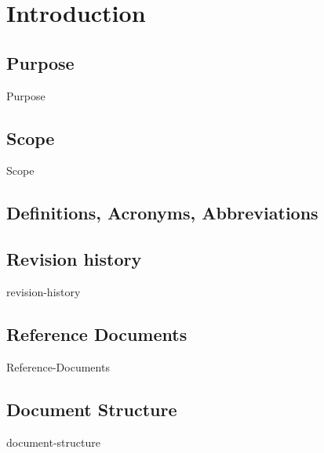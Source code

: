 \section{Introduction}

\subsection{Purpose}
{Purpose}

\subsection{Scope}
{Scope}

\subsection{Definitions, Acronyms, Abbreviations}
\printnoidxglossary[title=Definitions]
\printglossary
\glsaddallunused

\printnoidxglossary[title=Acronyms, type=acronym]
\printacronyms
\glsaddallunused[\acronymtype]


\subsection{Revision history}
{revision-history}

\subsection{Reference Documents}
{Reference-Documents}

\subsection{Document Structure}
{document-structure}
